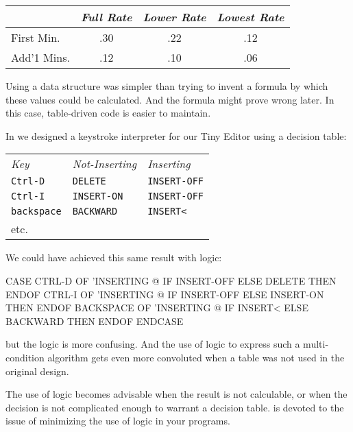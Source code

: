 \bigskip
\begin{tabular}{lccc}
          & \emph{Full Rate} & \emph{Lower Rate} & \emph{Lowest Rate} \\ \hline
First Min.  &       .30        &        .22        &          .12 \\ \hline
Add'1 Mins. &       .12        &        .10        &          .06 \\ \hline
\end{tabular}
\bigskip

\noindent Using a data structure was simpler than trying to invent a
formula by which these values could be calculated. And the formula might
prove wrong later. In this case, table-driven code is easier to maintain.

In  we designed a keystroke interpreter for our Tiny
Editor using a decision table:

\medskip
\begin{tabular}{lll}
\emph{Key}         & \emph{Not-Inserting} & \emph{Inserting} \\
\texttt{Ctrl-D}    & \texttt{DELETE}      & \texttt{INSERT-OFF} \\
\texttt{Ctrl-I}    & \texttt{INSERT-ON}   & \texttt{INSERT-OFF} \\
\texttt{backspace} & \texttt{BACKWARD}    & \texttt{INSERT<} \\
etc. & &
\end{tabular}
\medskip

\medbreak\noindent
We could have achieved this same result with logic:
\begin{Code}
CASE
   CTRL-D     OF  'INSERTING @  IF
      INSERT-OFF   ELSE DELETE     THEN   ENDOF
   CTRL-I     OF  'INSERTING @  IF
      INSERT-OFF   ELSE INSERT-ON  THEN   ENDOF
   BACKSPACE  OF  'INSERTING @  IF
      INSERT<      ELSE BACKWARD   THEN   ENDOF
ENDCASE
\end{Code}
but the logic is more confusing. And the use of logic to express such a
multi-condition algorithm gets even more convoluted when a table was
not used in the original design.

The use of logic becomes advisable when the result is not calculable,
or when the decision is not complicated enough to warrant a decision
table.  is devoted to the issue of minimizing the use of logic
in your programs.

